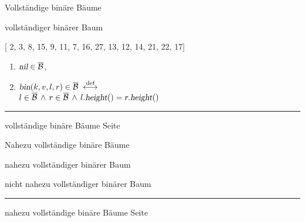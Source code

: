 \documentclass{slides}
\newcommand{\Bin}{\mathcal{B}}
\newcounter{mypage}
\begin{document}
\begin{slide}{}
\normalsize

\begin{center}
Vollst\"andige bin\"are B\"aume
\end{center}
\vspace*{0.5cm}

\footnotesize
vollst\"andiger bin\"arer Baum

 
[ 2, 3, 8, 15, 9, 11, 7, 16, 27, 13, 12, 14, 21, 22, 17]

\begin{enumerate}
\item $\textsl{nil} \in \overline{\Bin}$,
\item $\textsl{bin}(k,v,l,r) \in \overline{\Bin} 
       \;\stackrel{\mbox{\scriptsize def}}{\longleftrightarrow}\;$ \\[0.3cm]
      $l \in \overline{\Bin} \,\wedge\, r \in \overline{\Bin} \,\wedge\,
       l.\textsl{height}() = r.\textsl{height}()$ 
\end{enumerate}
   


\vspace*{\fill}
\tiny \addtocounter{mypage}{1}
\rule{17cm}{1mm}
vollst\"andige bin\"are B\"aume \hspace*{\fill} Seite 
\end{slide}


\begin{slide}{}
\normalsize

\begin{center}
Nahezu vollst\"andige bin\"are B\"aume
\end{center}
\vspace*{0.5cm}

\footnotesize
nahezu vollst\"andiger bin\"arer Baum


nicht nahezu vollst\"andiger bin\"arer Baum



\vspace*{\fill}
\tiny \addtocounter{mypage}{1}
\rule{17cm}{1mm}
nahezu vollst\"andige bin\"are B\"aume \hspace*{\fill} Seite 
\end{slide}
\end{document}
